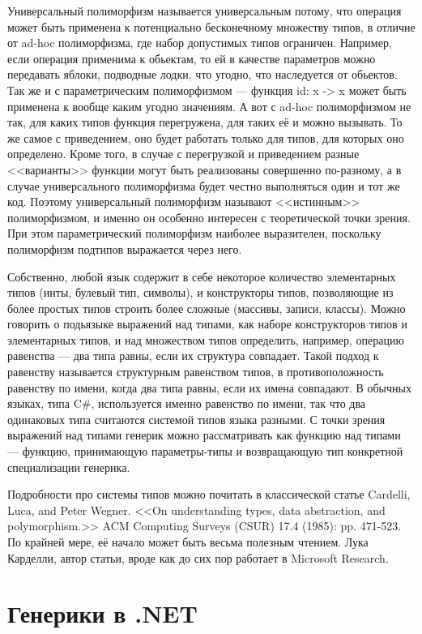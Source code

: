 \documentclass[a5paper]{article}
\begin{document}
Универсальный полиморфизм называется универсальным потому, что операция может быть применена к потенциально бесконечному множеству типов, в отличие от ad-hoc полиморфизма, где набор допустимых типов ограничен. Например, если операция применима к обьектам, то ей в качестве параметров можно передавать яблоки, подводные лодки, что угодно, что наследуется от обьектов. Так же и с параметрическим полиморфизмом --- функция id: x -> x может быть применена к вообще каким угодно значениям. А вот с ad-hoc полиморфизмом не так, для каких типов функция перегружена, для таких её и можно вызывать. То же самое с приведением, оно будет работать только для типов, для которых оно определено. Кроме того, в случае с перегрузкой и приведением разные <<варианты>> функции могут быть реализованы совершенно по-разному, а в случае универсального полиморфизма будет честно выполняться один и тот же код. Поэтому универсальный полиморфизм называют <<истинным>> полиморфизмом, и именно он особенно интересен с теоретической точки зрения. При этом параметрический полиморфизм наиболее выразителен, поскольку полиморфизм подтипов выражается через него.

Собственно, любой язык содержит в себе некоторое количество элементарных типов (инты, булевый тип, символы), и конструкторы типов, позволяющие из более простых типов строить более сложные (массивы, записи, классы). Можно говорить о подьязыке выражений над типами, как наборе конструкторов типов и элементарных типов, и над множеством типов определить, например, операцию равенства --- два типа равны, если их структура совпадает. Такой подход к равенству называется структурным равенством типов, в противоположность равенству по имени, когда два типа равны, если их имена совпадают. В обычных языках, типа C\#, используется именно равенство по имени, так что два одинаковых типа считаются системой типов языка разными. С точки зрения выражений над типами генерик можно рассматривать как функцию над типами --- функцию, принимающую параметры-типы и возвращающую тип конкретной специализации генерика.

Подробности про системы типов можно почитать в классической статье Cardelli, Luca, and Peter Wegner. <<On understanding types, data abstraction, and polymorphism.>> ACM Computing Surveys (CSUR) 17.4 (1985): pp. 471-523. По крайней мере, её начало может быть весьма полезным чтением. Лука Карделли, автор статьи, вроде как до сих пор работает в Microsoft Research.

\section{Генерики в .NET}
\end{document}
